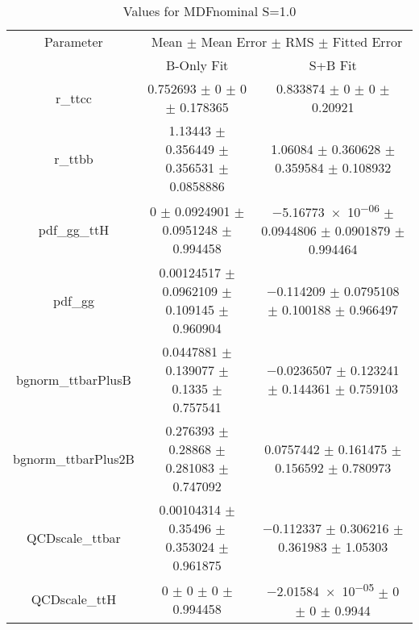 \begin{table}
\centering
\caption{Values for MDFnominal S=1.0}
\begin{tabular}{ccc}
\toprule
Parameter & \multicolumn{2}{c}{Mean $\pm$ Mean Error $\pm$ RMS $\pm$ Fitted Error}\\
 & B-Only Fit & S+B Fit\\
\midrule
r\_ttcc & \num{0.752693} $\pm$ \num{0} $\pm$ \num{0} $\pm$ \num{0.178365} & \num{0.833874} $\pm$ \num{0} $\pm$ \num{0} $\pm$ \num{0.20921}\\
r\_ttbb & \num{1.13443} $\pm$ \num{0.356449} $\pm$ \num{0.356531} $\pm$ \num{0.0858886} & \num{1.06084} $\pm$ \num{0.360628} $\pm$ \num{0.359584} $\pm$ \num{0.108932}\\
pdf\_gg\_ttH & \num{0} $\pm$ \num{0.0924901} $\pm$ \num{0.0951248} $\pm$ \num{0.994458} & \num{-5.16773e-06} $\pm$ \num{0.0944806} $\pm$ \num{0.0901879} $\pm$ \num{0.994464}\\
pdf\_gg & \num{0.00124517} $\pm$ \num{0.0962109} $\pm$ \num{0.109145} $\pm$ \num{0.960904} & \num{-0.114209} $\pm$ \num{0.0795108} $\pm$ \num{0.100188} $\pm$ \num{0.966497}\\
bgnorm\_ttbarPlusB & \num{0.0447881} $\pm$ \num{0.139077} $\pm$ \num{0.1335} $\pm$ \num{0.757541} & \num{-0.0236507} $\pm$ \num{0.123241} $\pm$ \num{0.144361} $\pm$ \num{0.759103}\\
bgnorm\_ttbarPlus2B & \num{0.276393} $\pm$ \num{0.28868} $\pm$ \num{0.281083} $\pm$ \num{0.747092} & \num{0.0757442} $\pm$ \num{0.161475} $\pm$ \num{0.156592} $\pm$ \num{0.780973}\\
QCDscale\_ttbar & \num{0.00104314} $\pm$ \num{0.35496} $\pm$ \num{0.353024} $\pm$ \num{0.961875} & \num{-0.112337} $\pm$ \num{0.306216} $\pm$ \num{0.361983} $\pm$ \num{1.05303}\\
QCDscale\_ttH & \num{0} $\pm$ \num{0} $\pm$ \num{0} $\pm$ \num{0.994458} & \num{-2.01584e-05} $\pm$ \num{0} $\pm$ \num{0} $\pm$ \num{0.9944}\\
\bottomrule
\end{tabular}
\end{table}
